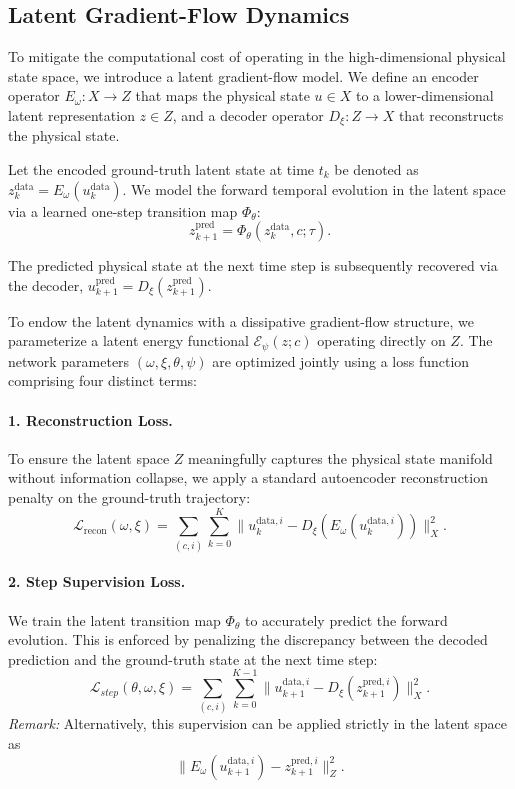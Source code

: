 \documentclass[11pt]{article}
\begin{document}
\subsection{Latent Gradient-Flow Dynamics}
To mitigate the computational cost of operating in the high-dimensional physical state space, we introduce a latent gradient-flow model. We define an encoder operator $E_\omega : X \to Z$ that maps the physical state $u \in X$ to a lower-dimensional latent representation $z \in Z$, and a decoder operator $D_\xi : Z \to X$ that reconstructs the physical state. 

Let the encoded ground-truth latent state at time $t_k$ be denoted as $z_k^\text{data} = E_\omega(u_k^\text{data})$. We model the forward temporal evolution in the latent space via a learned one-step transition map $\Phi_\theta$:
$$ z_{k+1}^\text{pred} = \Phi_\theta(z_k^\text{data}, c; \tau). $$

The predicted physical state at the next time step is subsequently recovered via the decoder, $u_{k+1}^\text{pred} = D_\xi(z_{k+1}^\text{pred})$. 

To endow the latent dynamics with a dissipative gradient-flow structure, we parameterize a latent energy functional $\mathcal{E}_\psi(z; c)$ operating directly on $Z$. The network parameters $(\omega, \xi, \theta, \psi)$ are optimized jointly using a loss function comprising four distinct terms:

\paragraph{1. Reconstruction Loss.}
To ensure the latent space $Z$ meaningfully captures the physical state manifold without information collapse, we apply a standard autoencoder reconstruction penalty on the ground-truth trajectory:
$$ \mathcal{L}_\text{recon}(\omega, \xi) = \sum_{(c,i)} \sum_{k=0}^{K} \| u_k^{\text{data},i} - D_\xi(E_\omega(u_k^{\text{data},i})) \|_X^2. $$

\paragraph{2. Step Supervision Loss.}
We train the latent transition map $\Phi_\theta$ to accurately predict the forward evolution. This is enforced by penalizing the discrepancy between the decoded prediction and the ground-truth state at the next time step:
$$ \mathcal{L}_{step}(\theta, \omega, \xi) = \sum_{(c,i)} \sum_{k=0}^{K-1} \| u_{k+1}^{\text{data},i} - D_\xi(z_{k+1}^{\text{pred},i}) \|_X^2. $$
\textit{Remark:} Alternatively, this supervision can be applied strictly in the latent space as $$\| E_\omega(u_{k+1}^{\text{data},i}) - z_{k+1}^{\text{pred},i} \|_Z^2.$$
\end{document}
